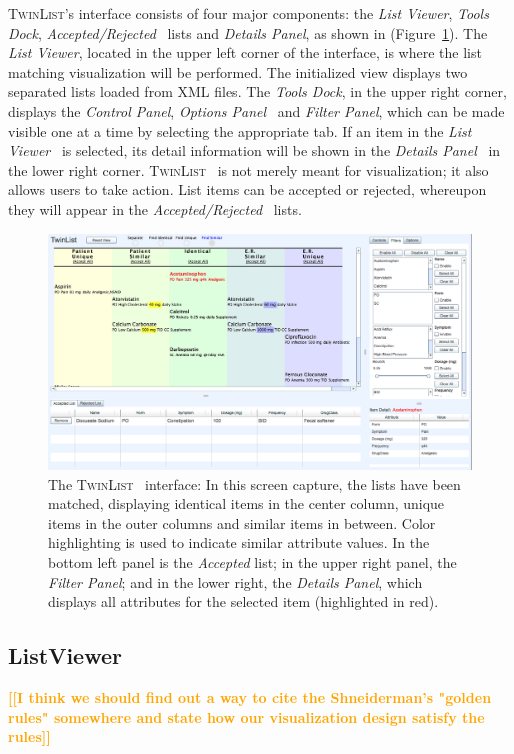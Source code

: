 \documentclass{chi2009}
\newcommand{\todo}[1]{\textsf{\textbf{\textcolor{Orange}{[[#1]]}}}}
\newcommand{\TwinList}{\textsc{TwinList}}
\newcommand{\ListViewer}{\textit{List Viewer}}
\newcommand{\AcceptedRejected}{\textit{Accepted/Rejected}}
\newcommand{\Details}{\textit{Details Panel}}
\newcommand{\Tools}{\textit{Tools Dock}}
\newcommand{\Controls}{\textit{Control Panel}}
\newcommand{\Filters}{\textit{Filter Panel}}
\newcommand{\Options}{\textit{Options Panel}}
\begin{document}
\TwinList's interface consists of four major components: the \ListViewer, \Tools, \AcceptedRejected~ lists and \Details, as shown in (Figure~\ref{fig:interface}). The \ListViewer, located in the upper left corner of the interface, is where the list matching visualization will be performed. The initialized view displays two separated lists loaded from XML files. The \Tools, in the upper right corner, displays the \Controls, \Options~ and \Filters, which can be made visible one at a time by selecting the appropriate tab. If an item in the \ListViewer~ is selected, its detail information will be shown in the \Details~ in the lower right corner. \TwinList~ is not merely meant for visualization; it also allows users to take action. List items can be accepted or rejected, whereupon they will appear in the \AcceptedRejected~ lists.

\begin{figure}
\begin{center}
\includegraphics[width=1\linewidth]{img/interface2.png}
\end{center}
   \caption{The \TwinList~ interface: In this screen capture, the lists have been matched, displaying identical items in the center column, unique items in the outer columns and similar items in between. Color highlighting is used to indicate similar attribute values. In the bottom left panel is the \textit{Accepted} list; in the upper right panel, the \Filters; and in the lower right, the \Details, which displays all attributes for the selected item (highlighted in red).}
   \label{fig:interface}
\end{figure}

\subsection{ListViewer}
 \todo{I think we should find out a way to cite the Shneiderman's "golden rules" somewhere and state how our visualization design satisfy the rules}
 
\end{document}
